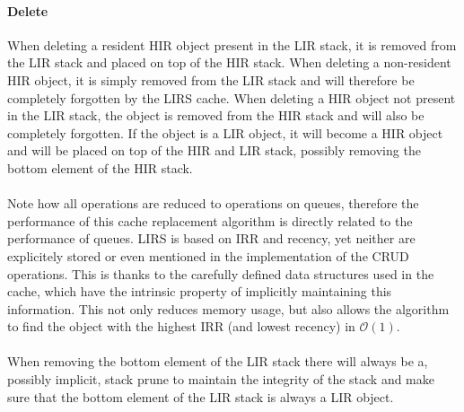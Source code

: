 \documentclass[pdftex,a4paper,12pt,twoside]{report}
\begin{document}
\paragraph{Delete} When deleting a resident HIR object present in the LIR stack, it is removed from the LIR stack and placed on top of the HIR stack. When deleting a non-resident HIR object, it is simply removed from the LIR stack and will therefore be completely forgotten by the LIRS cache. When deleting a HIR object not present in the LIR stack, the object is removed from the HIR stack and will also be completely forgotten. If the object is a LIR object, it will become a HIR object and will be placed on top of the HIR and LIR stack, possibly removing the bottom element of the HIR stack.
\\\\
Note how all operations are reduced to operations on queues, therefore the performance of this cache replacement algorithm is directly related to the performance of queues. LIRS is based on IRR and recency, yet neither are explicitely stored or even mentioned in the implementation of the CRUD operations. This is thanks to the carefully defined data structures used in the cache, which have the intrinsic property of implicitly maintaining this information. This not only reduces memory usage, but also allows the algorithm to find the object with the highest IRR (and lowest recency) in $\mathcal{O}(1)$.
\\\\
When removing the bottom element of the LIR stack there will always be a, possibly implicit, stack prune to maintain the integrity of the stack and make sure that the bottom element of the LIR stack is always a LIR object.
\end{document}
